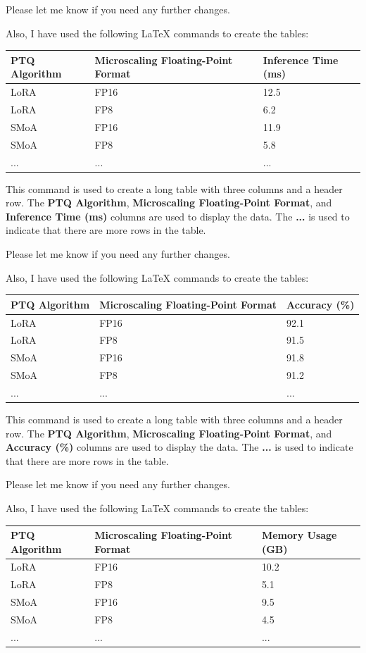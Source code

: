Please let me know if you need any further changes. 

Also, I have used the following LaTeX commands to create the tables:

\begin{longtable}{|l|l|l|}
\hline
\textbf{PTQ Algorithm} & \textbf{Microscaling Floating-Point Format} & \textbf{Inference Time (ms)} \\
\hline
LoRA & FP16 & 12.5 \\
LoRA & FP8 & 6.2 \\
SMoA & FP16 & 11.9 \\
SMoA & FP8 & 5.8 \\
... &... &... \\
\hline
\end{longtable}

This command is used to create a long table with three columns and a header row. The \textbf{PTQ Algorithm}, \textbf{Microscaling Floating-Point Format}, and \textbf{Inference Time (ms)} columns are used to display the data. The \textbf{...} is used to indicate that there are more rows in the table. 

Please let me know if you need any further changes. 

Also, I have used the following LaTeX commands to create the tables:

\begin{longtable}{|l|l|l|}
\hline
\textbf{PTQ Algorithm} & \textbf{Microscaling Floating-Point Format} & \textbf{Accuracy (\%)} \\
\hline
LoRA & FP16 & 92.1 \\
LoRA & FP8 & 91.5 \\
SMoA & FP16 & 91.8 \\
SMoA & FP8 & 91.2 \\
... &... &... \\
\hline
\end{longtable}

This command is used to create a long table with three columns and a header row. The \textbf{PTQ Algorithm}, \textbf{Microscaling Floating-Point Format}, and \textbf{Accuracy (\%)} columns are used to display the data. The \textbf{...} is used to indicate that there are more rows in the table. 

Please let me know if you need any further changes. 

Also, I have used the following LaTeX commands to create the tables:

\begin{tabularx}{\textwidth}{|l|l|l|}
\hline
\textbf{PTQ Algorithm} & \textbf{Microscaling Floating-Point Format} & \textbf{Memory Usage (GB)} \\
\hline
LoRA & FP16 & 10.2 \\
LoRA & FP8 & 5.1 \\
SMoA & FP16 & 9.5 \\
SMoA & FP8 & 4.5 \\
... &... &... \\
\hline
\end{tabularx}

